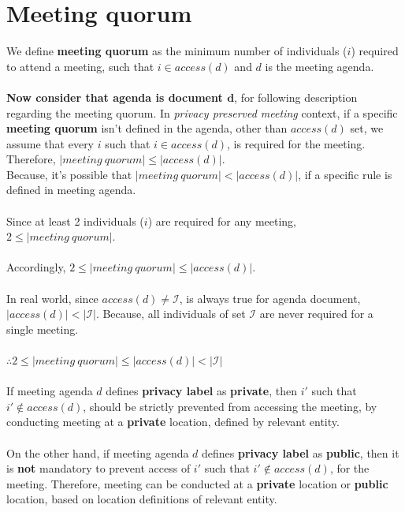 \documentclass{article}
\begin{document}
\section{Meeting quorum}
\noindent
We define \textbf{meeting quorum} as the minimum number of individuals ($i$) required to attend a meeting, such that $i \in access(d)$ and $d$ is the meeting agenda. \\ \\
\textbf{Now consider that agenda is document $\textbf{d}$}, for following description regarding the meeting quorum. In \textit{privacy preserved meeting} context, if a specific \textbf{meeting quorum} isn't defined in the agenda, other than $access(d)$ set, we assume that every $i$ such that $i \in access(d)$, is required for the meeting. Therefore, $|meeting\ quorum| \leq |access(d)|$.\\
Because, it's possible that $|meeting\ quorum| < |access(d)|$, if a specific rule is defined in meeting agenda. \\ \\
Since at least 2 individuals ($i$) are required for any meeting, $2 \leq |meeting\ quorum|$. \\ \\
Accordingly, $2 \leq |meeting\ quorum| \leq |access(d)|$. \\ \\
In real world, since $access(d) \ne \mathcal{I}$, is always true for agenda document, $|access(d)| < |\mathcal{I}|$. Because, all individuals of set $\mathcal{I}$ are never required for a single meeting.\\ \\
$\therefore 2 \leq |meeting\ quorum| \leq |access(d)| < |\mathcal{I}|$ \\ \\
If meeting agenda $d$ defines \textbf{privacy label} as \textbf{private}, then $i'$ such that $i' \notin access(d)$, should be strictly prevented from accessing the meeting, by conducting meeting at a \textbf{private} location, defined by relevant entity.\\ \\
On the other hand, if meeting agenda $d$ defines \textbf{privacy label} as \textbf{public}, then it is \textbf{not} mandatory to prevent access of $i'$ such that $i' \notin access(d)$, for the meeting. Therefore, meeting can be conducted at a \textbf{private} location or \textbf{public} location, based on location definitions of relevant entity.\\ \\
\end{document}
